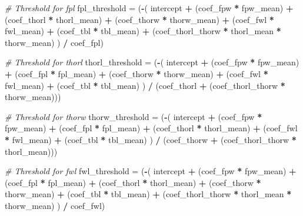 \documentclass[
]{article}
\newenvironment{Shaded}{\begin{snugshade}}{\end{snugshade}}
\newcommand{\CommentTok}[1]{\textcolor[rgb]{0.56,0.35,0.01}{\textit{#1}}}
\newcommand{\NormalTok}[1]{#1}
\newcommand{\OtherTok}[1]{\textcolor[rgb]{0.56,0.35,0.01}{#1}}
\newcommand{\SpecialCharTok}[1]{\textcolor[rgb]{0.81,0.36,0.00}{\textbf{#1}}}
\begin{document}
\begin{Shaded}
\begin{Highlighting}[]
\CommentTok{\# Threshold for fpl}
\NormalTok{fpl\_threshold }\OtherTok{=}\NormalTok{ (}\SpecialCharTok{{-}}\NormalTok{(}
\NormalTok{  intercept }\SpecialCharTok{+} 
\NormalTok{  (coef\_fpw }\SpecialCharTok{*}\NormalTok{ fpw\_mean) }\SpecialCharTok{+} 
\NormalTok{  (coef\_thorl }\SpecialCharTok{*}\NormalTok{ thorl\_mean) }\SpecialCharTok{+} 
\NormalTok{  (coef\_thorw }\SpecialCharTok{*}\NormalTok{ thorw\_mean) }\SpecialCharTok{+} 
\NormalTok{  (coef\_fwl }\SpecialCharTok{*}\NormalTok{ fwl\_mean) }\SpecialCharTok{+} 
\NormalTok{  (coef\_tbl }\SpecialCharTok{*}\NormalTok{ tbl\_mean) }\SpecialCharTok{+} 
\NormalTok{  (coef\_thorl\_thorw }\SpecialCharTok{*}\NormalTok{ thorl\_mean }\SpecialCharTok{*}\NormalTok{ thorw\_mean)}
\NormalTok{) }\SpecialCharTok{/}\NormalTok{ coef\_fpl)}

\CommentTok{\# Threshold for thorl}
\NormalTok{thorl\_threshold }\OtherTok{=}\NormalTok{ (}\SpecialCharTok{{-}}\NormalTok{(}
\NormalTok{  intercept }\SpecialCharTok{+} 
\NormalTok{  (coef\_fpw }\SpecialCharTok{*}\NormalTok{ fpw\_mean) }\SpecialCharTok{+} 
\NormalTok{  (coef\_fpl }\SpecialCharTok{*}\NormalTok{ fpl\_mean) }\SpecialCharTok{+} 
\NormalTok{  (coef\_thorw }\SpecialCharTok{*}\NormalTok{ thorw\_mean) }\SpecialCharTok{+} 
\NormalTok{  (coef\_fwl }\SpecialCharTok{*}\NormalTok{ fwl\_mean) }\SpecialCharTok{+} 
\NormalTok{  (coef\_tbl }\SpecialCharTok{*}\NormalTok{ tbl\_mean)}
\NormalTok{) }\SpecialCharTok{/}\NormalTok{ (coef\_thorl }\SpecialCharTok{+}\NormalTok{ (coef\_thorl\_thorw }\SpecialCharTok{*}\NormalTok{ thorw\_mean)))}

\CommentTok{\# Threshold for thorw}
\NormalTok{thorw\_threshold }\OtherTok{=}\NormalTok{ (}\SpecialCharTok{{-}}\NormalTok{(}
\NormalTok{  intercept }\SpecialCharTok{+} 
\NormalTok{  (coef\_fpw }\SpecialCharTok{*}\NormalTok{ fpw\_mean) }\SpecialCharTok{+} 
\NormalTok{  (coef\_fpl }\SpecialCharTok{*}\NormalTok{ fpl\_mean) }\SpecialCharTok{+} 
\NormalTok{  (coef\_thorl }\SpecialCharTok{*}\NormalTok{ thorl\_mean) }\SpecialCharTok{+} 
\NormalTok{  (coef\_fwl }\SpecialCharTok{*}\NormalTok{ fwl\_mean) }\SpecialCharTok{+} 
\NormalTok{  (coef\_tbl }\SpecialCharTok{*}\NormalTok{ tbl\_mean)}
\NormalTok{) }\SpecialCharTok{/}\NormalTok{ (coef\_thorw }\SpecialCharTok{+}\NormalTok{ (coef\_thorl\_thorw }\SpecialCharTok{*}\NormalTok{ thorl\_mean)))}

\CommentTok{\# Threshold for fwl}
\NormalTok{fwl\_threshold }\OtherTok{=}\NormalTok{ (}\SpecialCharTok{{-}}\NormalTok{(}
\NormalTok{  intercept }\SpecialCharTok{+} 
\NormalTok{  (coef\_fpw }\SpecialCharTok{*}\NormalTok{ fpw\_mean) }\SpecialCharTok{+} 
\NormalTok{  (coef\_fpl }\SpecialCharTok{*}\NormalTok{ fpl\_mean) }\SpecialCharTok{+} 
\NormalTok{  (coef\_thorl }\SpecialCharTok{*}\NormalTok{ thorl\_mean) }\SpecialCharTok{+} 
\NormalTok{  (coef\_thorw }\SpecialCharTok{*}\NormalTok{ thorw\_mean) }\SpecialCharTok{+} 
\NormalTok{  (coef\_tbl }\SpecialCharTok{*}\NormalTok{ tbl\_mean) }\SpecialCharTok{+} 
\NormalTok{  (coef\_thorl\_thorw }\SpecialCharTok{*}\NormalTok{ thorl\_mean }\SpecialCharTok{*}\NormalTok{ thorw\_mean)}
\NormalTok{) }\SpecialCharTok{/}\NormalTok{ coef\_fwl)}


\end{Highlighting}
\end{Shaded}
\end{document}
